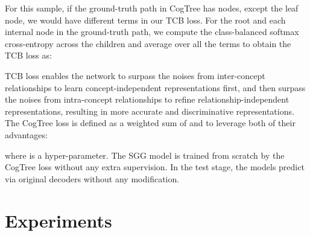\documentclass[letterpaper]{article} \usepackage{aaai21}  \usepackage{times}  \usepackage{helvet} \usepackage{courier}  \usepackage[hyphens]{url}  \usepackage{graphicx} \urlstyle{rm} \def\UrlFont{\rm}  \usepackage{natbib}  \usepackage{caption} \frenchspacing  \setlength{\pdfpagewidth}{8.5in}  \setlength{\pdfpageheight}{11in}  \usepackage{amsmath,amsthm}
\begin{document}
For this sample, if the ground-truth path in CogTree has  nodes, except the leaf node, we would have  different terms in our TCB loss. For the root and each internal node in the  ground-truth path, we compute the class-balanced softmax cross-entropy across the children and average over all the terms to obtain the TCB loss as:



TCB loss  enables  the  network  to  surpass  the  noises from inter-concept relationships to learn concept-independent representations first, and then surpass  the  noises from intra-concept relationships to refine relationship-independent representations,  resulting in more accurate and discriminative representations. The CogTree loss is defined as a weighted sum of  and  to leverage both of their advantages:

where  is a hyper-parameter. The SGG model is trained from scratch by the CogTree loss without any extra supervision. In the test stage, the models predict via original decoders without any modification. 










\section{Experiments}
\label{sec:experiments}




\iffalse
\begin{figure}[th]
    \centering
    \texttt{[image: figure/induced-tree.png]}
    \caption{Cognition tree structure.}
    \label{fig:trees}
\end{figure}
\fi
\end{document}
